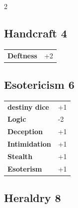 \begin{multicols}{2}
\begin{tcolorbox}
\end{tcolorbox}

\begin{tcolorbox}
    \subsection*{Handcraft \hfill \small{4 }}
    \tcblower




\begin{tabular}{@{}ll@{}}
    \textbf{Deftness} & +2\\
\end{tabular}


\end{tcolorbox}

\begin{tcolorbox}
    \subsection*{Esotericism \hfill \small{6 }}
    \tcblower




\begin{tabular}{@{}ll@{}}
    \textbf{destiny dice} & +1\\
    \textbf{Logic} & -2\\
    \textbf{Deception} & +1\\
    \textbf{Intimidation} & +1\\
    \textbf{Stealth} & +1\\
    \textbf{Esoterism} & +1\\
\end{tabular}


\end{tcolorbox}

\begin{tcolorbox}
    \subsection*{Heraldry \hfill \small{8 }}
    \tcblower





\end{tcolorbox}
\end{multicols}
